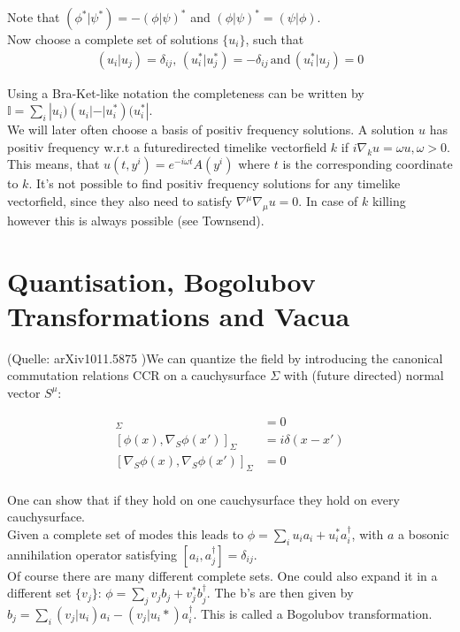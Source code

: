 Note that \((\phi^*|\psi^*) = -(\phi|\psi)^*\) and \((\phi|\psi)^* = (\psi|\phi)\).\\

Now choose a complete set of solutions $\{u_i\}$, such that
\begin{align}
(u_i| u_j) = \delta_{ij},\,(u_i^*| u_j^*) = -\delta_{ij}\,\text{and}\,(u_i^*| u_j) = 0
\end{align}

Using a Bra-Ket-like notation the completeness can be written by \(\mathbb{I} = \sum_i |u_i)(u_i| - |u_i^*)(u_i^*|\).\\

We will later often choose a basis of positiv frequency solutions. A solution $u$ has positiv frequency w.r.t a futuredirected timelike vectorfield \(k\) if  \(i\nabla_k u = \omega u, \omega > 0\). This means, that \(u(t, y^i) = e^{-i\omega t} A(y^i)\) where \(t\) is the corresponding coordinate to \(k\). It's not possible to find positiv frequency solutions for any timelike vectorfield, since they also need to satisfy \(\nabla^\mu\nabla_\mu u = 0\). In case of \(k\) killing however this is always possible (see Townsend).

\section{Quantisation, Bogolubov Transformations and Vacua}

(Quelle: arXiv1011.5875 )We can quantize the field by introducing the canonical commutation relations CCR on a cauchysurface \(\Sigma\) with (future directed) normal vector $S^\mu$:

\begin{align}
[\phi(x),\phi(x')]_\Sigma &= 0\\
[\phi(x),\nabla_S \phi(x')]_\Sigma &= i\delta(x-x')\\
[\nabla_S \phi(x),\nabla_S \phi(x')]_\Sigma &= 0\\
\end{align}

One can show that if they hold on one cauchysurface they hold on every cauchysurface.\\
Given a complete set of modes this leads to \(\phi = \sum_i u_i a_i + u_i^* a_i^\dagger\), with \(a\) a bosonic annihilation operator satisfying \([a_i,a_j^\dagger] = \delta_{ij}\).\\

Of course there are many different complete sets. One could also expand it in a different set \(\{v_j\}\): \(\phi = \sum_j v_j b_j + v_j^* b_j^\dagger\). The b's are then given by \(b_j = \sum_i (v_j|u_i) a_i - (v_j|u_i*) a_i^\dagger\). This is called a Bogolubov transformation.\\

